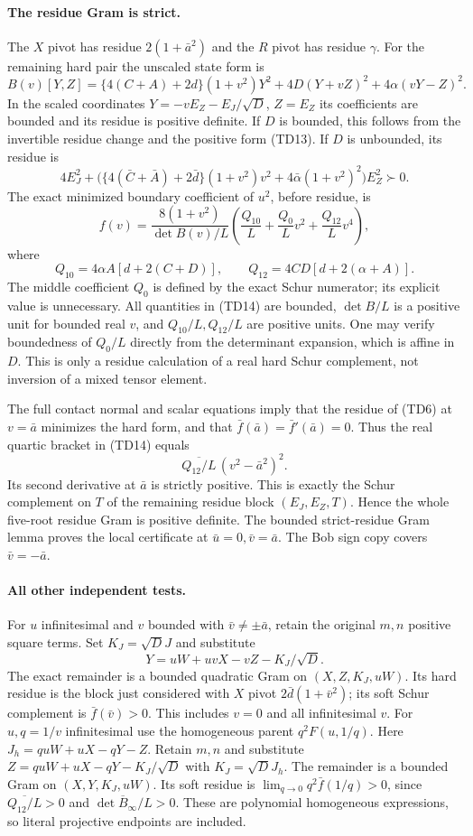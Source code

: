 \paragraph{The residue Gram is strict.}
The $X$ pivot has residue $2(1+\bar a^2)$ and the $R$ pivot has
residue $\gamma$. For the remaining hard pair the unscaled state
form is
\[
 B(v)[Y,Z]=\{4(C+A)+2d\}(1+v^2)Y^2
           +4D(Y+vZ)^2+4\alpha(vY-Z)^2.           \tag{TD13}
\]
In the scaled coordinates $Y=-vE_Z-E_J/\sqrt D$, $Z=E_Z$ its
coefficients are bounded and its residue is positive definite.
If $D$ is bounded, this follows from the invertible residue change
and the positive form (TD13). If $D$ is unbounded, its residue is
\[
 4E_J^2+\bigl(\{4(\bar C+\bar A)+2\bar d\}(1+v^2)v^2
                  +4\bar\alpha(1+v^2)^2\bigr)E_Z^2\succ0.
\]
The exact minimized boundary coefficient of $u^2$, before residue,
is
\[
 f(v)=\frac{8(1+v^2)}{\det B(v)/L}
       \left(\frac{Q_{10}}L+\frac{Q_0}L v^2+\frac{Q_{12}}L v^4\right),
                                                               \tag{TD14}
\]
where
\[
 Q_{10}=4\alpha A[d+2(C+D)],\qquad
 Q_{12}=4CD[d+2(\alpha+A)].
\]
The middle coefficient $Q_0$ is defined by the exact Schur numerator;
its explicit value is unnecessary. All quantities in (TD14) are
bounded, $\det B/L$ is a positive unit for bounded real $v$, and
$Q_{10}/L,Q_{12}/L$ are positive units. One may verify boundedness
of $Q_0/L$ directly from the determinant expansion, which is affine
in $D$. This is only a residue calculation of a real hard Schur
complement, not inversion of a mixed tensor element.

The full contact normal and scalar equations imply that the residue
of (TD6) at $v=\bar a$ minimizes the hard form, and that
$\bar f(\bar a)=\bar f'(\bar a)=0$. Thus the real quartic bracket
in (TD14) equals
\[
 \overline{Q_{12}/L}\,(v^2-\bar a^2)^2.
\]
Its second derivative at $\bar a$ is strictly positive. This is
exactly the Schur complement on $T$ of the remaining residue block
$(E_J,E_Z,T)$. Hence the whole five-root residue Gram is positive
definite. The bounded strict-residue Gram lemma proves the local
certificate at $\bar u=0,\bar v=\bar a$. The Bob sign copy covers
$\bar v=-\bar a$.

\paragraph{All other independent tests.}
For $u$ infinitesimal and $v$ bounded with
$\bar v\ne\pm\bar a$, retain the original $m,n$ positive square terms. Set
$K_J=\sqrt D J$ and substitute
\[
 Y=uW+uvX-vZ-K_J/\sqrt D.
\]
The exact remainder is a bounded quadratic Gram on
$(X,Z,K_J,uW)$. Its hard residue is the block just considered with
$X$ pivot $2\bar d(1+\bar v^2)$; its soft Schur complement is
$\bar f(\bar v)>0$. This includes $v=0$ and all infinitesimal $v$.
For $u,q=1/v$ infinitesimal use the homogeneous parent $q^2F(u,1/q)$.
Here $J_h=quW+uX-qY-Z$. Retain $m,n$ and substitute
$Z=quW+uX-qY-K_J/\sqrt D$ with $K_J=\sqrt D J_h$.
The remainder is a bounded Gram on $(X,Y,K_J,uW)$. Its soft residue
is $\lim_{q\to0}q^2\bar f(1/q)>0$, since
$\overline{Q_{12}/L}>0$ and
$\overline{\det B_\infty/L}>0$.
These are polynomial homogeneous expressions, so literal projective
endpoints are included.

